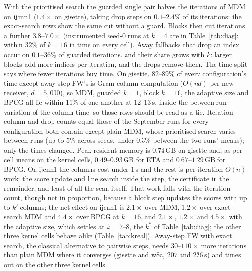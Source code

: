 With the prioritised search the guarded single pair halves the
iterations of MDM on ijcnn1 ($1.4\times$ on gisette), taking drop steps
on $0.1$--$2.4\%$ of its iterations; the exact-search rows show the same
cut without a guard. Blocks then cut iterations a further $3.8$--$7.0\times$
(instrumented seed-0 runs at $k{=}4$ are in Table~\ref{tab:diag}: within
$32\%$ of $k{=}16$ in time on every cell). Away fallbacks that drop an index occur on
$0.1$--$36\%$ of guarded iterations, and their share grows with $k$:
larger blocks add more indices per iteration, and the drops remove
them. The time split says where fewer iterations buy time. On gisette,
$82$--$89\%$ of every configuration's time except away-step FW's is
Gram-column computation ($O(nd)$ per new receiver, $d{=}5{,}000$), so
MDM, guarded $k{=}1$, block $k{=}16$, the adaptive size and BPCG all lie
within $11\%$ of one another at $12$--$13$\,s, inside the between-run
variation of the column time, so those rows should be read as a tie.
Iteration, column and drop counts equal those of the September runs for
every configuration both contain except plain MDM, whose prioritised
search varies between runs (up to $5\%$ across seeds, under $0.3\%$
between the two runs' means); only the times changed. Peak resident
memory is $0.74$\,GB on gisette and, as per-cell means on the kernel
cells, $0.49$--$0.93$\,GB for ETA and $0.67$--$1.29$\,GB for BPCG. On
ijcnn1 the columns cost under $1$\,s
and the rest is per-iteration $O(n)$ work: the score update and line
search inside the step, the certificate in the remainder, and least of
all the scan itself. That work falls with the iteration count, though
not in proportion, because a block step updates the scores with up to
$k'$ columns; the net effect on ijcnn1 is $2.1\times$ over MDM,
$1.2\times$ over exact-search MDM and $4.4\times$ over BPCG at $k{=}16$,
and $2.1\times$, $1.2\times$ and $4.5\times$ with the adaptive size,
which settles at $k{=}7$--$8$, the $k^*$ of Table~\ref{tab:diag};
the other three kernel cells behave alike (Table~\ref{tab:kreal}).
Away-step FW with exact search, the classical alternative to pairwise
steps, needs $30$--$110\times$ more iterations than plain MDM where it
converges (gisette and w8a, $207$ and $226$\,s) and times out on the
other three kernel cells.

